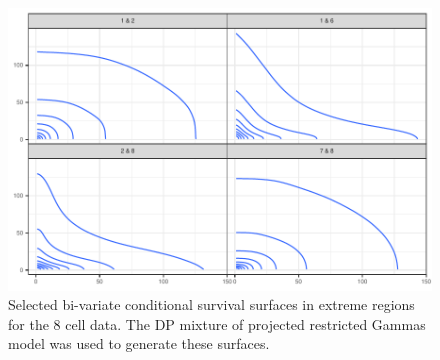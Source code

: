 \begin{figure}[h]
  \label{fig:condsurv2d}
  \includegraphics{./images/condsurv_2d}
  \caption{
    Selected bi-variate conditional survival surfaces in extreme regions for the 8 cell data.
    The DP mixture of projected restricted Gammas model was used to generate these surfaces.
  }
\end{figure}










